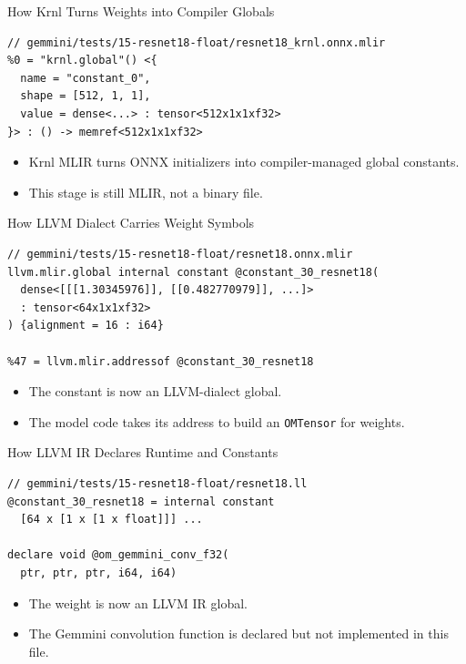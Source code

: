 \documentclass[aspectratio=169,10pt]{beamer}
\newcommand{\code}[1]{\texttt{\footnotesize #1}}
\begin{document}
\begin{frame}[fragile]{How Krnl Turns Weights into Compiler Globals}
  \begin{lstlisting}
// gemmini/tests/15-resnet18-float/resnet18_krnl.onnx.mlir
%0 = "krnl.global"() <{
  name = "constant_0",
  shape = [512, 1, 1],
  value = dense<...> : tensor<512x1x1xf32>
}> : () -> memref<512x1x1xf32>
  \end{lstlisting}
  \begin{itemize}
    \item Krnl MLIR turns ONNX initializers into compiler-managed global constants.
    \item This stage is still MLIR, not a binary file.
  \end{itemize}
\end{frame}

\begin{frame}[fragile]{How LLVM Dialect Carries Weight Symbols}
  \begin{lstlisting}
// gemmini/tests/15-resnet18-float/resnet18.onnx.mlir
llvm.mlir.global internal constant @constant_30_resnet18(
  dense<[[[1.30345976]], [[0.482770979]], ...]>
  : tensor<64x1x1xf32>
) {alignment = 16 : i64}

%47 = llvm.mlir.addressof @constant_30_resnet18
  \end{lstlisting}
  \begin{itemize}
    \item The constant is now an LLVM-dialect global.
    \item The model code takes its address to build an \code{OMTensor} for weights.
  \end{itemize}
\end{frame}

\begin{frame}[fragile]{How LLVM IR Declares Runtime and Constants}
  \begin{lstlisting}
// gemmini/tests/15-resnet18-float/resnet18.ll
@constant_30_resnet18 = internal constant
  [64 x [1 x [1 x float]]] ...

declare void @om_gemmini_conv_f32(
  ptr, ptr, ptr, i64, i64)
  \end{lstlisting}
  \begin{itemize}
    \item The weight is now an LLVM IR global.
    \item The Gemmini convolution function is declared but not implemented in this file.
  \end{itemize}
\end{frame}
\end{document}
